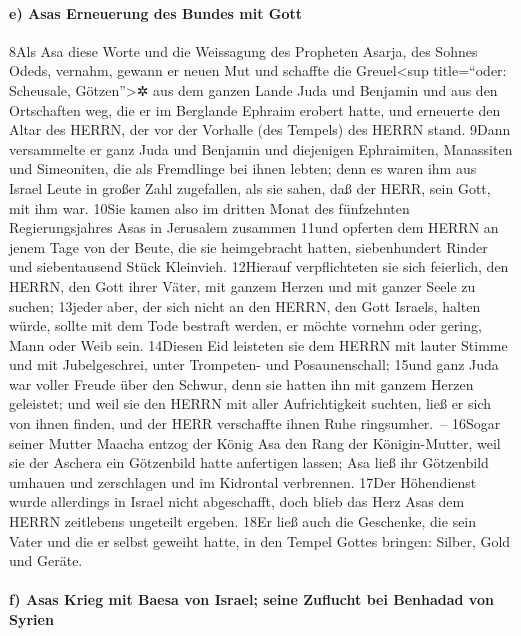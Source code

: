 \hypertarget{e-asas-erneuerung-des-bundes-mit-gott}{%
\paragraph{e) Asas Erneuerung des Bundes mit
Gott}\label{e-asas-erneuerung-des-bundes-mit-gott}}

8Als Asa diese Worte und die Weissagung des Propheten Asarja, des Sohnes
Odeds, vernahm, gewann er neuen Mut und schaffte die Greuel\textless sup
title=``oder: Scheusale, Götzen''\textgreater✲ aus dem ganzen Lande Juda
und Benjamin und aus den Ortschaften weg, die er im Berglande Ephraim
erobert hatte, und erneuerte den Altar des HERRN, der vor der Vorhalle
(des Tempels) des HERRN stand. 9Dann versammelte er ganz Juda und
Benjamin und diejenigen Ephraimiten, Manassiten und Simeoniten, die als
Fremdlinge bei ihnen lebten; denn es waren ihm aus Israel Leute in
großer Zahl zugefallen, als sie sahen, daß der HERR, sein Gott, mit ihm
war. 10Sie kamen also im dritten Monat des fünfzehnten Regierungsjahres
Asas in Jerusalem zusammen 11und opferten dem HERRN an jenem Tage von
der Beute, die sie heimgebracht hatten, siebenhundert Rinder und
siebentausend Stück Kleinvieh. 12Hierauf verpflichteten sie sich
feierlich, den HERRN, den Gott ihrer Väter, mit ganzem Herzen und mit
ganzer Seele zu suchen; 13jeder aber, der sich nicht an den HERRN, den
Gott Israels, halten würde, sollte mit dem Tode bestraft werden, er
möchte vornehm oder gering, Mann oder Weib sein. 14Diesen Eid leisteten
sie dem HERRN mit lauter Stimme und mit Jubelgeschrei, unter Trompeten-
und Posaunenschall; 15und ganz Juda war voller Freude über den Schwur,
denn sie hatten ihn mit ganzem Herzen geleistet; und weil sie den HERRN
mit aller Aufrichtigkeit suchten, ließ er sich von ihnen finden, und der
HERR verschaffte ihnen Ruhe ringsumher.~-- 16Sogar seiner Mutter Maacha
entzog der König Asa den Rang der Königin-Mutter, weil sie der Aschera
ein Götzenbild hatte anfertigen lassen; Asa ließ ihr Götzenbild umhauen
und zerschlagen und im Kidrontal verbrennen. 17Der Höhendienst wurde
allerdings in Israel nicht abgeschafft, doch blieb das Herz Asas dem
HERRN zeitlebens ungeteilt ergeben. 18Er ließ auch die Geschenke, die
sein Vater und die er selbst geweiht hatte, in den Tempel Gottes
bringen: Silber, Gold und Geräte.

\hypertarget{f-asas-krieg-mit-baesa-von-israel-seine-zuflucht-bei-benhadad-von-syrien}{%
\paragraph{f) Asas Krieg mit Baesa von Israel; seine Zuflucht bei
Benhadad von
Syrien}\label{f-asas-krieg-mit-baesa-von-israel-seine-zuflucht-bei-benhadad-von-syrien}}

